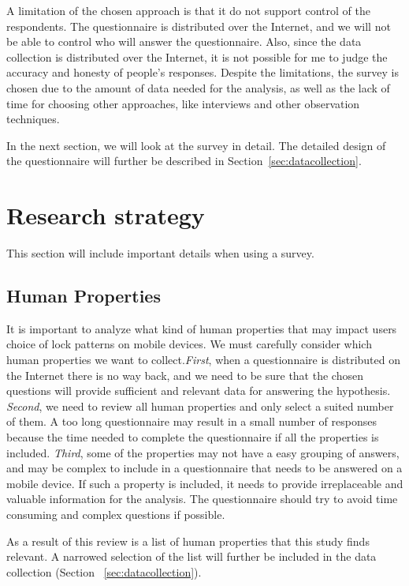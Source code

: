   A limitation of the chosen approach is that it do not support control of the respondents. The questionnaire is distributed over the Internet, and we will not be able to control who will answer the questionnaire. Also, since the data collection is distributed over the Internet, it is not possible for me to judge the accuracy and honesty of people's responses. Despite the limitations, the survey is chosen due to the amount of data needed for the analysis, as well as the lack of time for choosing other approaches, like interviews and other observation techniques. 
  
  In the next section, we will look at the survey in detail. 
  The detailed design of the questionnaire will further be described in Section~\ref{sec:datacollection}.

  \section{Research strategy}

  This section will include important details when using a survey. 

    \subsection{Human Properties} \label{sec:datarequirements}
    
    It is important to analyze what kind of human properties that may impact users choice of lock patterns on mobile devices. We must carefully consider which human properties we want to collect.{\it First}, when a questionnaire is distributed on the Internet there is no way back, and we need to be sure that the chosen questions will provide sufficient and relevant data for answering the hypothesis. {\it Second}, we need to review all human properties and only select a suited number of them. A too long questionnaire may result in a small number of responses because the time needed to complete the questionnaire if all the properties is included. {\it Third}, some of the properties may not have a easy grouping of answers, and may be complex to include in a questionnaire that needs to be answered on a mobile device. If such a property is included, it needs to provide irreplaceable and valuable information for the analysis. The questionnaire should try to avoid time consuming and complex questions if possible. 

    As a result of this review is a list of human properties that this study finds relevant. A narrowed selection of the list will further be included in the data collection (Section ~\ref{sec:datacollection}).  

